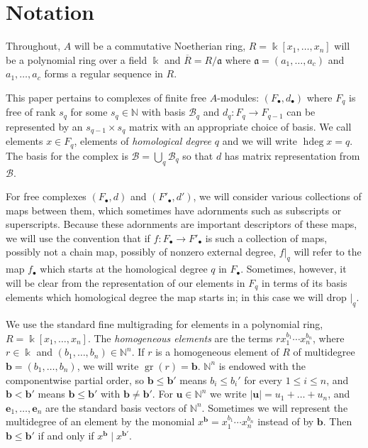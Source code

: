 \documentclass[12pt]{amsart}
\theoremstyle{plain}
\theoremstyle{definition}
\newcommand{\kk}{\Bbbk}
\newcommand{\B}{\mathcal{B}}
\newcommand{\hdeg}{\operatorname{hdeg}}
\newcommand{\gr}{\operatorname{gr}}
\newcommand{\aaa}{\mathfrak{a}}
\newcommand{\N}{\mathbb{N}}
\begin{document}
\section{Notation} \label{s:Notation}

Throughout, $A$ will be a commutative Noetherian ring, $R=\kk[x_1, \ldots, x_n]$ will be a polynomial ring over a field $\kk$ and $\overline{R}=R/\aaa$ where $\aaa=(a_1, \ldots, a_c)$ and $a_1, \ldots, a_c$ forms a regular sequence in $R$.

This paper pertains to complexes of finite free $A$-modules: $(F_\bullet, d_\bullet)$ where $F_q$ is free of rank $s_q$ for some $s_q \in \N$ with basis $\B_q$ and $d_q: F_q \rightarrow F_{q-1}$ can be represented by an $s_{q-1} \times s_q$ matrix with an appropriate choice of basis. We call elements $x \in F_q$, elements of \emph{homological degree} $q$ and we will write $\hdeg x=q$. The basis for the complex is $\B = \bigcup_q \B_q$ so that $d$ has matrix representation from $\B$.

For free complexes $(F_\bullet, d)$ and $(F'_\bullet, d')$, we will consider various collections of maps between them, which sometimes have adornments such as subscripts or superscripts. Because these adornments are important descriptors of these maps, we will use the convention that if $f :F_\bullet \rightarrow F'_\bullet$ is such a collection of maps,
possibly not a chain map,
possibly of nonzero external degree, $f|_q$ will refer to the map $f_\bullet$ which starts at the homological degree $q$ in $F_\bullet$. Sometimes, however, it will be clear from the representation of our elements in $F_q$ in terms of its basis elements which homological degree the map starts in; in this case we will drop $|_q$.

We use the standard fine multigrading for elements in a polynomial ring, $R=\kk [x_1, \ldots, x_n]$.
The \emph{homogeneous elements} are the terms $rx_1^{b_1}\cdots x_n^{b_n}$, where $r \in \kk$ and $(b_1, \ldots, b_n) \in \N^n$. If $r$ is a homogeneous element of $R$ of multidegree ${\boldsymbol{b}}=(b_1, \ldots, b_n)$, we will write $\gr(r)={\boldsymbol{b}}$. $\N^n$ is endowed with the componentwise partial order, so $\boldsymbol{b} \le \boldsymbol{b'}$ means $b_i \le b_i'$ for every $1 \le i \le n$, and $\boldsymbol{b} < \boldsymbol{b'}$ means $\boldsymbol{b} \le \boldsymbol{b'}$ with $\boldsymbol{b} \neq \boldsymbol{b'}$. For $\boldsymbol{u} \in \N^n$ we write $|\boldsymbol{u}| = u_1 + \dots + u_n$, and $\boldsymbol{e}_1, \dots, \boldsymbol{e}_n$ are the standard basis vectors of $\N^n$. Sometimes we will represent the multidegree of an element by the monomial $x^{\boldsymbol{b}}=x_1^{b_1}\cdots x_n^{b_n}$ instead of by $\boldsymbol{b}$. Then $\boldsymbol{b} \leq \boldsymbol{b}'$ if and only if $x^{\boldsymbol{b}} \mid x^{\boldsymbol{b}'}$.
\end{document}
